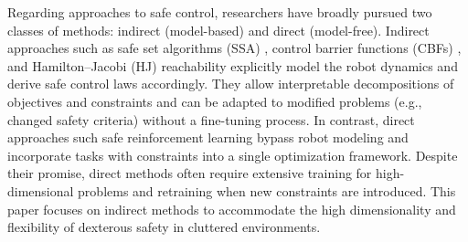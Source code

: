 


Regarding approaches to safe control, researchers have broadly pursued two classes of methods: indirect (model-based) and direct (model-free).
Indirect approaches such as safe set algorithms (SSA)  \cite{liu2014control, chen2023sis}, control barrier functions (CBFs) \cite{ames2016control, xiao2019control}, and Hamilton–Jacobi (HJ) reachability \cite{choi2021robust} explicitly model the robot dynamics and derive safe control laws accordingly.
They allow interpretable decompositions of objectives and constraints and can be adapted to modified problems (e.g., changed safety criteria) without a fine-tuning process.
In contrast, direct approaches such safe reinforcement learning bypass robot modeling and incorporate tasks with constraints into a single optimization framework.
Despite their promise, direct methods often require extensive training for high-dimensional problems and retraining when new constraints are introduced.
This paper focuses on indirect methods to accommodate the high dimensionality and flexibility of dexterous safety in cluttered environments.

